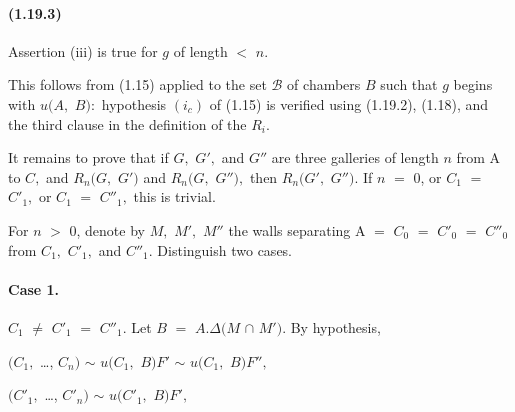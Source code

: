 \documentclass[10pt,a4paper]{article}
\begin{document}
\paragraph{(1.19.3)} Assertion (iii) is true for \ensuremath{g} of length \ensuremath{<} \ensuremath{n.}

This follows from (1.15) applied to the set \ensuremath{\mathcal{B}} of chambers \ensuremath{B} such that \ensuremath{g} begins with \ensuremath{u(A,} \ensuremath{B):} hypothesis \ensuremath{(i_c)} of (1.15) is verified using (1.19.2), (1.18), and the third clause in the definition of the \ensuremath{R_i.}\par

It remains to prove that if \ensuremath{G,} \ensuremath{G',} and \ensuremath{G''} are three galleries of length \ensuremath{n} from A to \ensuremath{C,} and \ensuremath{R_n(G,} \ensuremath{G')} and \ensuremath{R_n(G,} \ensuremath{G''),} then \ensuremath{R_n(G',} \ensuremath{G'').} If \ensuremath{n} \ensuremath{=} 0, or \ensuremath{C_1} \ensuremath{=} \ensuremath{C'_1,} or \ensuremath{C_1} \ensuremath{=} \ensuremath{C''_1,} this is trivial.\par

For \ensuremath{n} \ensuremath{>} 0, denote by \ensuremath{M,} \ensuremath{M',} \ensuremath{M''} the walls separating A \ensuremath{=} \ensuremath{C_0} \ensuremath{=} \ensuremath{C'_0} \ensuremath{=} \ensuremath{C''_0} from \ensuremath{C_1,} \ensuremath{C'_1,} and \ensuremath{C''_1.} Distinguish two cases.\par

\paragraph{Case 1.} \ensuremath{C_1} \ensuremath{\ne{}} \ensuremath{C'_1} \ensuremath{=} \ensuremath{C''_1.} Let \ensuremath{B} \ensuremath{=} \ensuremath{A.\Delta{}(M} \ensuremath{\cap{}} \ensuremath{M').} By hypothesis,

\ensuremath{(C_1,} \ldots{}, \ensuremath{C_n)} \ensuremath{\sim{}} \ensuremath{u(C_1,} \ensuremath{B)F'} \ensuremath{\sim{}} \ensuremath{u(C_1,} \ensuremath{B)F'',}\par

\ensuremath{(C'_1,} \ldots{}, \ensuremath{C'_n)} \ensuremath{\sim{}} \ensuremath{u(C'_1,} \ensuremath{B)F',}\par
\end{document}
